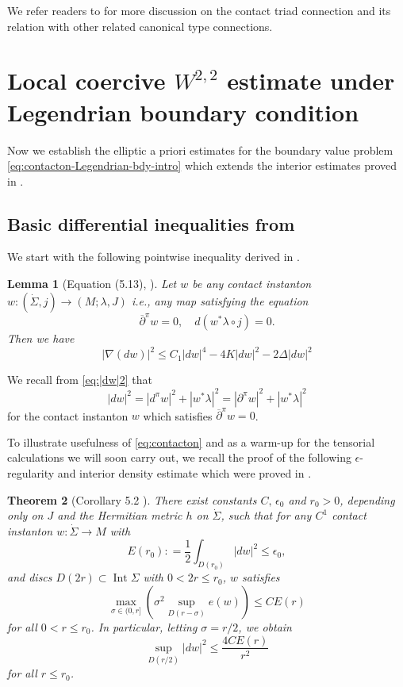 \documentclass[reqno]{amsart}
\newcommand{\del}{\partial}
\newcommand{\be}{\begin{equation}}
\newcommand{\ee}{\end{equation}}
\theoremstyle{theorem}
\newtheorem{thm}{Theorem}[section]
\newtheorem{lem}[thm]{Lemma}
\theoremstyle{definition}
\numberwithin{equation}{section}
\def\delbar{{\overline \partial}}
\def\delbar{{\overline \partial}}
\begin{document}
We refer readers to \cite{oh-wang:connection} for more discussion on the contact triad connection and its relation with other related canonical type connections.

\section{Local coercive $W^{2,2}$ estimate under Legendrian boundary condition}
\label{sec:local-W12}

Now we establish the elliptic a priori estimates for the boundary
value problem \eqref{eq:contacton-Legendrian-bdy-intro} which extends the interior estimates proved
in \cite{oh-wang:CR-map1}.

\subsection{Basic differential inequalities from \cite{oh-wang:CR-map1}}

We start with the following pointwise inequality derived in \cite{oh-wang:CR-map1}.
\begin{lem}[Equation (5.13), \cite{oh-wang:CR-map1}]\label{lem:second:derivative}
Let $w$ be any contact instanton $w: (\dot \Sigma,j) \to (M; \lambda, J)$ i.e., any
map satisfying the equation
\be\label{eq:contacton}
\delbar^\pi w = 0 , \quad d(w^*\lambda \circ j) = 0.
\ee
Then we have
\be\label{eq:second-derivative}
|\nabla(dw)|^2 \leq C_1 |dw|^4 - 4K |dw|^2 - 2\Delta |dw|^2
\ee
\end{lem}
We recall from \eqref{eq:|dw|2} that
$$
|dw|^2 = |d^\pi w|^2 + |w^*\lambda|^2 = |\del^\pi w|^2 + |w^*\lambda|^2
$$
for the contact instanton $w$ which satisfies $\delbar^\pi w = 0$.

To illustrate usefulness of \eqref{eq:contacton} and as a warm-up for the
tensorial calculations we will soon carry out, we recall the proof of
the following $\epsilon$-regularity and interior density estimate
which were proved in \cite{oh-wang:CR-map1}.

\begin{thm}[Corollary 5.2 \cite{oh-wang:CR-map1}]\label{thm:density}
There exist constants $C, \, \epsilon_0$ and $r_0 > 0$, depending only on $J$ and
the Hermitian metric $h$ on $\dot \Sigma$, such that for any
 $C^1$ contact instanton $w: \dot \Sigma \to M$ with
$$
E(r_0): = \frac{1}{2}\int_{D(r_0)} |dw|^2 \leq \epsilon_0,
$$
and discs $D(2r) \subset \operatorname{Int}\Sigma$ with $0 < 2r \leq r_0$,
$w$ satisfies
\be\label{eq:schoen's}
\max_{\sigma \in (0,r]} \left(\sigma^2 \sup_{D(r-\sigma)}
e(w)\right) \leq CE(r)
\ee
for all $0< r \leq r_0$. In particular, letting $\sigma = r/2$, we obtain
\be\label{eq:supeu}
\sup_{D(r/2)} |dw|^2 \leq \frac{4C E(r)}{r^2}
\ee
for all $r \leq r_0$.
\end{thm}
\end{document}
